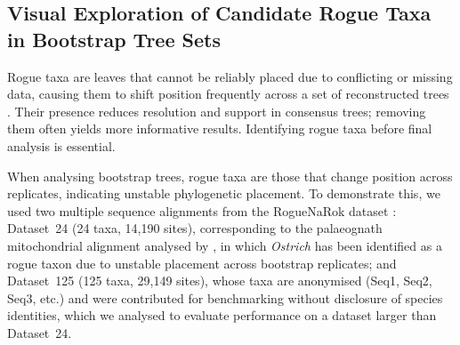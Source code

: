 \subsection{Visual Exploration of Candidate Rogue Taxa in Bootstrap Tree Sets}
Rogue taxa are leaves that cannot be reliably placed due to conflicting or missing data, causing them to shift position frequently across a set of reconstructed trees \citep{Wilkinson1996}. Their presence reduces resolution and support in consensus trees; removing them often yields more informative results. Identifying rogue taxa before final analysis is essential.

When analysing bootstrap trees, rogue taxa are those that change position across replicates, indicating unstable phylogenetic placement.  To demonstrate this, we used two multiple sequence alignments from the RogueNaRok dataset \citep{Aberer2013RogueNaRok,RogueNaRokDryad2013}: Dataset~24 (24 taxa, 14{,}190 sites), corresponding to the palaeognath mitochondrial alignment analysed by \citet{Phillips2010}, in which \textit{Ostrich} has been identified as a rogue taxon due to unstable placement across bootstrap replicates; and Dataset~125 (125 taxa, 29{,}149 sites), whose taxa are anonymised (Seq1, Seq2, Seq3, etc.) and were contributed for benchmarking without disclosure of species identities, which we analysed to evaluate performance on a dataset larger than Dataset~24.

